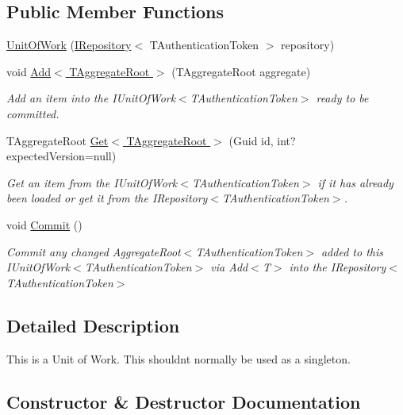\subsection*{Public Member Functions}
\begin{DoxyCompactItemize}
\item 
\hyperlink{classCqrs_1_1Domain_1_1UnitOfWork_a4986f6b8e53b62aa22322ad616dccc0a}{Unit\+Of\+Work} (\hyperlink{interfaceCqrs_1_1Domain_1_1IRepository}{I\+Repository}$<$ T\+Authentication\+Token $>$ repository)
\item 
void \hyperlink{classCqrs_1_1Domain_1_1UnitOfWork_a840214f97d3661c7b5a739df65fadc9f}{Add$<$ T\+Aggregate\+Root $>$} (T\+Aggregate\+Root aggregate)
\begin{DoxyCompactList}\small\item\em Add an item into the I\+Unit\+Of\+Work$<$\+T\+Authentication\+Token$>$ ready to be committed. \end{DoxyCompactList}\item 
T\+Aggregate\+Root \hyperlink{classCqrs_1_1Domain_1_1UnitOfWork_a1e953136c916aee711068813078aed05}{Get$<$ T\+Aggregate\+Root $>$} (Guid id, int? expected\+Version=null)
\begin{DoxyCompactList}\small\item\em Get an item from the I\+Unit\+Of\+Work$<$\+T\+Authentication\+Token$>$ if it has already been loaded or get it from the I\+Repository$<$\+T\+Authentication\+Token$>$. \end{DoxyCompactList}\item 
void \hyperlink{classCqrs_1_1Domain_1_1UnitOfWork_a7401e41dd8ce4457551c252ca6402d31}{Commit} ()
\begin{DoxyCompactList}\small\item\em Commit any changed Aggregate\+Root$<$\+T\+Authentication\+Token$>$ added to this I\+Unit\+Of\+Work$<$\+T\+Authentication\+Token$>$ via Add$<$\+T$>$ into the I\+Repository$<$\+T\+Authentication\+Token$>$ \end{DoxyCompactList}\end{DoxyCompactItemize}


\subsection{Detailed Description}
This is a Unit of Work. This shouldn\textquotesingle{}t normally be used as a singleton. 



\subsection{Constructor \& Destructor Documentation}
\mbox{\label{classCqrs_1_1Domain_1_1UnitOfWork_a4986f6b8e53b62aa22322ad616dccc0a}} 
